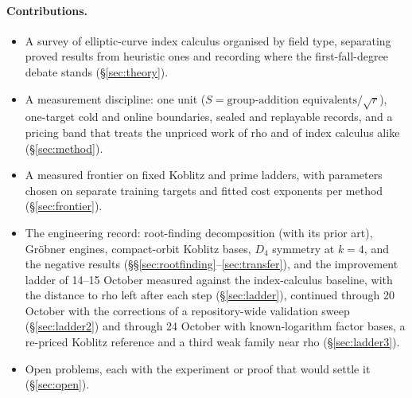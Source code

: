 \paragraph{Contributions.}
\begin{itemize}
\item A survey of elliptic-curve index calculus organised by field type,
  separating proved results from heuristic ones and recording where the
  first-fall-degree debate stands (\S\ref{sec:theory}).
\item A measurement discipline: one unit ($S=\text{group-addition
  equivalents}/\sqrt r$), one-target cold and online boundaries, sealed
  and replayable records, and a pricing band that treats the unpriced work
  of rho and of index calculus alike (\S\ref{sec:method}).
\item A measured frontier on fixed Koblitz and prime ladders, with
  parameters chosen on separate training targets and fitted cost exponents
  per method (\S\ref{sec:frontier}).
\item The engineering record: root-finding decomposition (with its prior
  art), Gr\"obner engines, compact-orbit Koblitz bases, $D_4$ symmetry at
  $k=4$, and the negative results (\S\S\ref{sec:rootfinding}--\ref{sec:transfer}),
  and the improvement ladder of 14--15 October measured against the
  index-calculus baseline, with the distance to rho left after each step
  (\S\ref{sec:ladder}), continued through 20 October with the corrections of a
  repository-wide validation sweep (\S\ref{sec:ladder2}) and through 24 October
  with known-logarithm factor bases, a re-priced Koblitz reference and a third
  weak family near rho (\S\ref{sec:ladder3}).
\item Open problems, each with the experiment or proof that would settle it
  (\S\ref{sec:open}).
\end{itemize}


